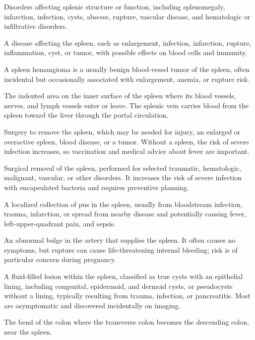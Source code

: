  Disorders affecting splenic structure or function, including splenomegaly, infarction, infection, cysts, abscess, rupture, vascular disease, and hematologic or infiltrative disorders.

 A disease affecting the spleen, such as enlargement, infection, infarction, rupture, inflammation, cyst, or tumor, with possible effects on blood cells and immunity.

 A spleen hemangioma is a usually benign blood-vessel tumor of the spleen, often incidental but occasionally associated with enlargement, anemia, or rupture risk.

 The indented area on the inner surface of the spleen where its blood vessels, nerves, and lymph vessels enter or leave. The splenic vein carries blood from the spleen toward the liver through the portal circulation.

 Surgery to remove the spleen, which may be needed for injury, an enlarged or overactive spleen, blood disease, or a tumor. Without a spleen, the risk of severe infection increases, so vaccination and medical advice about fever are important.

 Surgical removal of the spleen, performed for selected traumatic, hematologic, malignant, vascular, or other disorders. It increases the risk of severe infection with encapsulated bacteria and requires preventive planning.

 A localized collection of pus in the spleen, usually from bloodstream infection, trauma, infarction, or spread from nearby disease and potentially causing fever, left-upper-quadrant pain, and sepsis.

 An abnormal bulge in the artery that supplies the spleen. It often causes no symptoms, but rupture can cause life-threatening internal bleeding; risk is of particular concern during pregnancy.

 A fluid-filled lesion within the spleen, classified as true cysts with an epithelial
lining, including congenital, epidermoid, and dermoid cysts, or pseudocysts without a
lining, typically resulting from trauma, infection, or pancreatitis. Most are
asymptomatic and discovered incidentally on imaging.

 The bend of the colon where the transverse colon becomes the descending colon, near the spleen.


